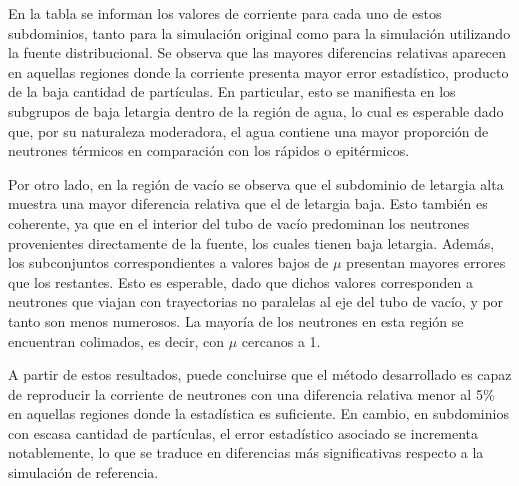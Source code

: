 En la tabla se informan los valores de corriente para cada uno de estos subdominios, tanto para la simulación original como para la simulación utilizando la fuente distribucional. Se observa que las mayores diferencias relativas aparecen en aquellas regiones donde la corriente presenta mayor error estadístico, producto de la baja cantidad de partículas. En particular, esto se manifiesta en los subgrupos de baja letargia dentro de la región de agua, lo cual es esperable dado que, por su naturaleza moderadora, el agua contiene una mayor proporción de neutrones térmicos en comparación con los rápidos o epitérmicos.

Por otro lado, en la región de vacío se observa que el subdominio de letargia alta muestra una mayor diferencia relativa que el de letargia baja. Esto también es coherente, ya que en el interior del tubo de vacío predominan los neutrones provenientes directamente de la fuente, los cuales tienen baja letargia. Además, los subconjuntos correspondientes a valores bajos de $\mu$ presentan mayores errores que los restantes. Esto es esperable, dado que dichos valores corresponden a neutrones que viajan con trayectorias no paralelas al eje del tubo de vacío, y por tanto son menos numerosos. La mayoría de los neutrones en esta región se encuentran colimados, es decir, con $\mu$ cercanos a 1.

A partir de estos resultados, puede concluirse que el método desarrollado es capaz de reproducir la corriente de neutrones con una diferencia relativa menor al 5\% en aquellas regiones donde la estadística es suficiente. En cambio, en subdominios con escasa cantidad de partículas, el error estadístico asociado se incrementa notablemente, lo que se traduce en diferencias más significativas respecto a la simulación de referencia.

